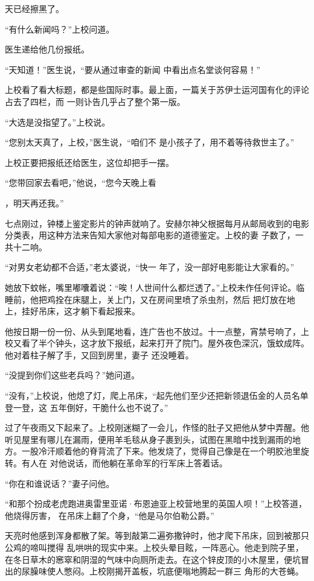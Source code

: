 \documentclass{article}
\begin{document}
天已经擦黑了。 


“有什么新闻吗？”上校问道。 


医生递给他几份报纸。 

“天知道！”医生说，“要从通过审查的新闻
中看出点名堂谈何容易！” 

上校看了看大标题，都是些国际时事。最上面，一篇关于苏伊士运河国有化的评论占去了四栏，而
一则讣告几乎占了整个第一版。 


“大选是没指望了。”上校说。 

“您别太天真了，上校，”医生说，“咱们不
是小孩子了，用不着等待救世主了。” 

上校正要把报纸还给医生，这位却把手一摆。

“您带回家去看吧，”他说，“您今天晚上看
\newpage

，明天再还我。” 

七点刚过，钟楼上鉴定影片的钟声就响了。安赫尔神父根据每月从邮局收到的电影分类表，用这种方法来告知大家他对每部电影的道德鉴定。上校的妻
子数了，一共十二响。 

“对男女老幼都不合适，”老太婆说，“快一
年了，没一部好电影能让大家看的。” 

她放下蚊帐，嘴里嘟囔着说：“唉！人世间什么都烂透了。”上校未作任何评论。临睡前，他把鸡拴在床腿上，关上门，又在房间里喷了杀虫剂，然后
把灯放在地上，挂好吊床，这才躺下看起报来。 

他按日期一份一份、从头到尾地看，连广告也不放过。十一点整，宵禁号响了，上校又看了半个钟头，这才放下报纸，起来打开了院门。屋外夜色深沉，饿蚊成阵。他对着柱子解了手，又回到房里，妻子
还没睡着。 

\newpage


“没提到你们这些老兵吗？”她问道。 

“没有，”上校说，他熄了灯，爬上吊床，“起先他们至少还把新领退伍金的人员名单登一登，这
五年倒好，干脆什么也不说了。” 

过了午夜雨又下起来了。上校刚迷糊了一会儿，作怪的肚子又把他从梦中弄醒。他听见屋里有哪儿在漏雨，便用羊毛毯从身子裹到头，试图在黑暗中找到漏雨的地方。一股冷汗顺着他的脊背流了下来。他发烧了，觉得自己像是在一个明胶池里旋转。有人在
对他说话，而他躺在革命军的行军床上答着话。 


“你在和谁说话？”妻子问他。 

“和那个扮成老虎跑进奥雷里亚诺·布恩迪亚上校营地里的英国人呗！”上校答道，他烧得厉害，
在吊床上翻了个身，“他是马尔伯勒公爵。” 

天亮时他感到浑身都散了架。等到敲第二遍弥撒钟时，他才爬下吊床，回到被那只公鸡的啼叫搅得
\newpage
乱哄哄的现实中来。上校头晕目眩，一阵恶心。他走到院子里，在冬日草木的窸窣和阴湿的气味中向厕所走去。在这个锌皮顶的小木屋里，便坑冒出的尿臊味使人憋闷。上校刚揭开盖板，坑底便嗡地腾起一群三
角形的大苍蝇。 
\end{document}

